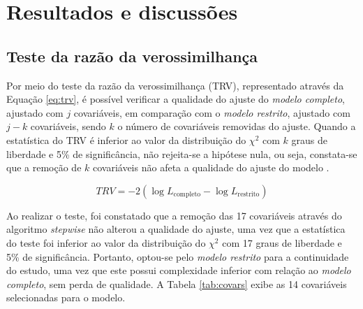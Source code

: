 \documentclass[twocolumn]{rbef}
\newcommand{\1}{\mathbbm{1}}
\begin{document}
\hypertarget{resultados-e-discussuxf5es}{%
\section{Resultados e discussões}\label{resultados-e-discussuxf5es}}

\hypertarget{teste-da-razuxe3o-da-verossimilhanuxe7a}{%
\subsection{Teste da razão da verossimilhança}\label{teste-da-razuxe3o-da-verossimilhanuxe7a}}

Por meio do teste da razão da verossimilhança (TRV), representado através da Equação \eqref{eq:trv}, é possível verificar a qualidade do ajuste do \textit{modelo completo}, ajustado com \(j\) covariáveis, em comparação com o \textit{modelo restrito}, ajustado com \(j-k\) covariáveis, sendo \(k\) o número de covariáveis removidas do ajuste. Quando a estatística do TRV é inferior ao valor da distribuição do \({\chi}^2\) com \(k\) graus de liberdade e 5\% de significância, não rejeita-se a hipótese nula, ou seja, constata-se que a remoção de \(k\) covariáveis não afeta a qualidade do ajuste do modelo \cite{Favero2017}.

\begin{equation}
TRV = -2(\log L_{\text{completo}} -\log L_{\text{restrito}})\label{eq:trv}
\end{equation}

Ao realizar o teste, foi constatado que a remoção das 17 covariáveis através do algoritmo \textit{stepwise} não alterou a qualidade do ajuste, uma vez que a estatística do teste foi inferior ao valor da distribuição do \({\chi}^2\) com 17 graus de liberdade e 5\% de significância. Portanto, optou-se pelo \textit{modelo restrito} para a continuidade do estudo, uma vez que este possui complexidade inferior com relação ao \textit{modelo completo}, sem perda de qualidade. A Tabela \ref{tab:covars} exibe as 14 covariáveis selecionadas para o modelo.
\end{document}
